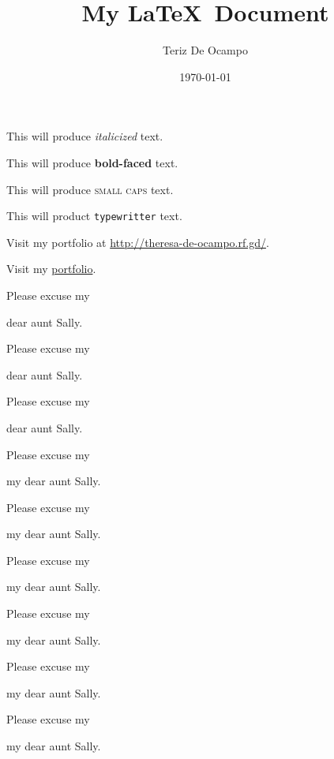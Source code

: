 \documentclass[11pt]{article}
\title{My \LaTeX\ Document}
\author{Teriz De Ocampo}
\date{\today}
\begin{document}
\maketitle
\tableofcontents
\pagebreak

  This will produce \textit{italicized} text.

  This will produce \textbf{bold-faced} text.

  This will produce \textsc{small caps} text.

  This will product \texttt{typewritter} text.

  Visit my portfolio at \url{http://theresa-de-ocampo.rf.gd/}.

  Visit my \href{http://theresa-de-ocampo.rf.gd/}{portfolio}.

  \vspace{1cm}

  Please excuse my \begin{large}dear aunt Sally.\end{large}

  Please excuse my \begin{Large}dear aunt Sally.\end{Large}

  Please excuse my \begin{LARGE}dear aunt Sally.\end{LARGE}

  Please excuse my \begin{huge} my dear aunt Sally.\end{huge}

  Please excuse my \begin{Huge} my dear aunt Sally.\end{Huge}

  \vspace{1cm}

  Please excuse my \begin{normalsize} my dear aunt Sally.\end{normalsize}

  Please excuse my \begin{small} my dear aunt Sally.\end{small}

  Please excuse my \begin{scriptsize} my dear aunt Sally.\end{scriptsize}

  Please excuse my \begin{tiny} my dear aunt Sally.\end{tiny}
\end{document}
